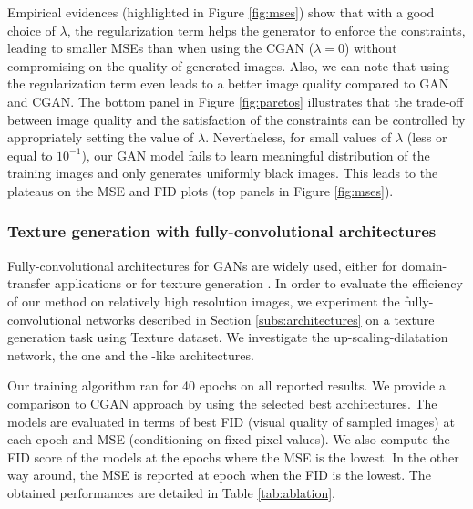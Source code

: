 Empirical evidences (highlighted in Figure \ref{fig:mses}) show that with a good choice of $\lambda$, the regularization term helps the generator to enforce the constraints, leading to smaller \ac{MSE}s than when using the \ac{CGAN} ($\lambda=0$) without compromising on the quality of generated images. Also, we can note that using the regularization term even leads to a better image quality compared to \ac{GAN} and \ac{CGAN}.
%
The bottom panel in Figure \ref{fig:paretos} illustrates that the trade-off between image quality and the satisfaction of the constraints can be controlled by appropriately setting the value of $\lambda$. Nevertheless, for small values of $\lambda$ (less or equal to $10^{-1}$), our GAN model fails to learn meaningful distribution of the training images and only generates uniformly black images. This leads to the plateaus on the \ac{MSE} and \ac{FID} plots (top panels in Figure \ref{fig:mses}).




\subsubsection{Texture generation with fully-convolutional architectures}
\label{sub:fcnn}
Fully-convolutional architectures for GANs are widely used, either for domain-transfer applications \citep{Zhu2017, Isola2016} or for texture generation \citep{Jetchev2017}. In order to evaluate the efficiency of our method on relatively high resolution images, we experiment the fully-convolutional networks described in Section \ref{subs:architectures} on a texture generation task using Texture dataset. We investigate the up-scaling-dilatation network, the  one and the -like architectures.

Our training algorithm ran for 40 epochs on all reported results. We provide a comparison to CGAN \citep{Mirza2014} approach by using the selected best architectures.
The models are evaluated in terms of best FID (visual quality of sampled images) at each epoch and MSE (conditioning on fixed pixel values).  We also compute the FID score of the models at the epochs where the MSE is the lowest. In the other way around, the MSE is reported at epoch when the FID is the lowest. The obtained performances are detailed in Table \ref{tab:ablation}.

